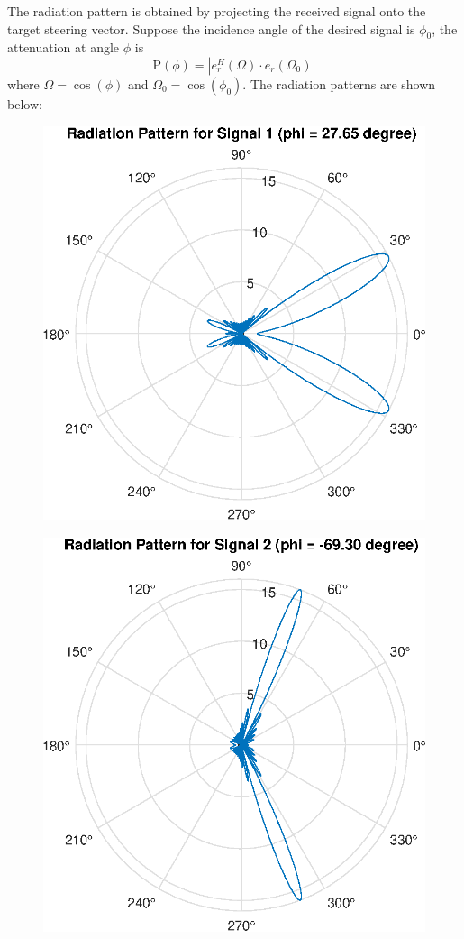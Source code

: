The radiation pattern is obtained by projecting the received signal onto the target steering 
vector. Suppose the incidence angle of the desired signal is $\phi_0$, the attenuation at angle 
$\phi$ is
\begin{equation*}
    \text{P}\left(\phi\right) = \left|e_r^{H}(\Omega) \cdot e_r(\Omega_0)\right|
\end{equation*}
where $\Omega = \cos\left(\phi\right)$ and $\Omega_0 = \cos\left(\phi_0\right)$.
The radiation patterns are shown below:
\begin{figure}[H]
    \centering
    \includegraphics[scale = 0.7]{s1.eps}
\end{figure}
\begin{figure}[H]
    \centering
    \includegraphics[scale = 0.7]{s2.eps}
\end{figure}
